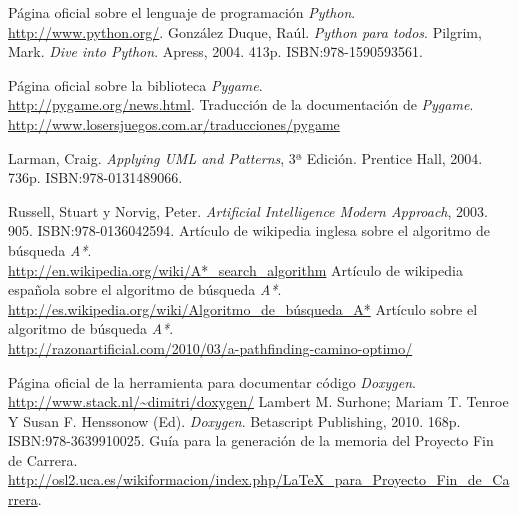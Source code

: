 \documentclass[a4paper,11pt]{article} %
\begin{document}
\begin{thebibliography}{99}
Página oficial sobre el lenguaje de programación \emph{Python}.\\ \url{http://www.python.org/}.
González Duque, Raúl. \emph{Python para todos}.
Pilgrim, Mark. \emph{Dive into Python}. Apress, 2004. 413p. ISBN:978-1590593561.

Página oficial sobre la biblioteca \emph{Pygame}.\\ \url{http://pygame.org/news.html}.
Traducción de la documentación de \emph{Pygame}.\\ \url{http://www.losersjuegos.com.ar/traducciones/pygame}

Larman, Craig. \emph{Applying UML and Patterns}, 3ª Edición. Prentice Hall, 2004. 736p. ISBN:978-0131489066.

Russell, Stuart y Norvig, Peter. \emph{Artificial Intelligence Modern Approach}, 2003. 905. ISBN:978-0136042594.
Artículo de wikipedia inglesa sobre el algoritmo de búsqueda \emph{A*}.\\ \url{http://en.wikipedia.org/wiki/A*_search_algorithm}
Artículo de wikipedia española sobre el algoritmo de búsqueda \emph{A*}.\\ \url{http://es.wikipedia.org/wiki/Algoritmo_de_búsqueda_A*}
Artículo sobre el algoritmo de búsqueda \emph{A*}.\\ \url{http://razonartificial.com/2010/03/a-pathfinding-camino-optimo/}

Página oficial de la herramienta para documentar código \emph{Doxygen}.\\ \url{http://www.stack.nl/~dimitri/doxygen/}
Lambert M. Surhone; Mariam T. Tenroe Y Susan F. Henssonow (Ed). \emph{Doxygen}. Betascript Publishing, 2010. 168p. ISBN:978-3639910025.  
Guía para la generación de la memoria del Proyecto Fin de Carrera.\\ \url{http://osl2.uca.es/wikiformacion/index.php/LaTeX_para_Proyecto_Fin_de_Carrera}.


\end{thebibliography}
\end{document}
